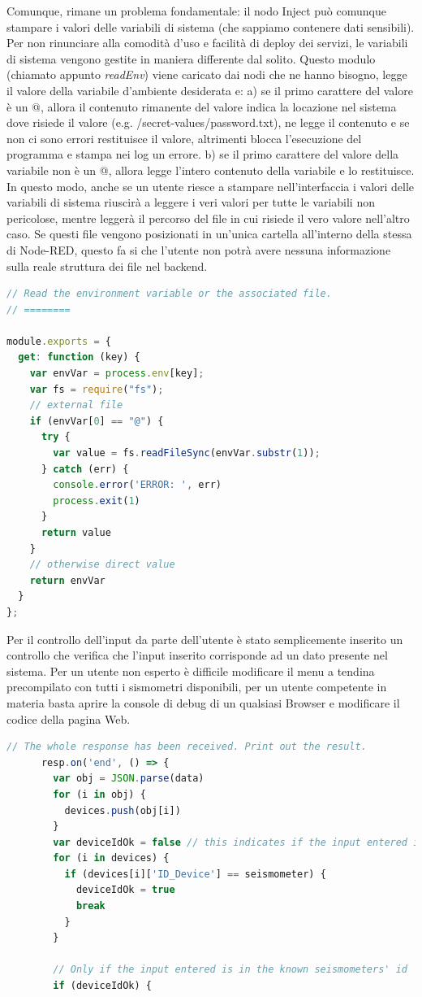 \documentclass[a4paper,10pt]{memoir}
\begin{document}
Comunque, rimane un problema fondamentale: il nodo Inject può comunque stampare i valori delle variabili di sistema (che sappiamo contenere dati sensibili).
Per non rinunciare alla comodità d'uso e facilità di deploy dei servizi, le variabili di sistema vengono gestite in maniera differente dal solito.
Questo modulo (chiamato appunto \textit{readEnv}) viene caricato dai nodi che ne hanno bisogno, legge il valore della variabile d'ambiente desiderata e: a) se il primo carattere del valore è un @, allora il contenuto rimanente del valore indica la locazione nel sistema dove risiede il valore (e.g. /secret-values/password.txt), ne legge il contenuto e se non ci sono errori restituisce il valore, altrimenti blocca l'esecuzione del programma e stampa nei log un errore. b) se il primo carattere del valore della variabile non è un @, allora legge l'intero contenuto della variabile e lo restituisce.
In questo modo, anche se un utente riesce a stampare nell'interfaccia i valori delle variabili di sistema riuscirà a leggere i veri valori per tutte le variabili non pericolose, mentre leggerà il percorso del file in cui risiede il vero valore nell'altro caso.
Se questi file vengono posizionati in un'unica cartella all'interno della stessa di Node-RED, questo fa si che l'utente non potrà avere nessuna informazione sulla reale struttura dei file nel backend.
\begin{lstlisting}[language=Javascript]
// Read the environment variable or the associated file.
// ========

module.exports = {
  get: function (key) {
    var envVar = process.env[key];
    var fs = require("fs");
    // external file
    if (envVar[0] == "@") {
      try {
        var value = fs.readFileSync(envVar.substr(1));
      } catch (err) {
        console.error('ERROR: ', err)
        process.exit(1)
      }
      return value
    }
    // otherwise direct value
    return envVar
  }
};

\end{lstlisting}

Per il controllo dell'input da parte dell'utente è stato semplicemente inserito un controllo che verifica che l'input inserito corrisponde ad un dato presente nel sistema.
Per un utente non esperto è difficile modificare il menu a tendina precompilato con tutti i sismometri disponibili, per un utente competente in materia basta aprire la console di debug di un qualsiasi Browser e modificare il codice della pagina Web.
\begin{lstlisting}[language=Javascript, firstnumber=34]
    // The whole response has been received. Print out the result.
      resp.on('end', () => {
        var obj = JSON.parse(data)
        for (i in obj) {
          devices.push(obj[i])
        }
        var deviceIdOk = false // this indicates if the input entered is in the group seismometers
        for (i in devices) {
          if (devices[i]['ID_Device'] == seismometer) {
            deviceIdOk = true
            break
          }
        }

        // Only if the input entered is in the known seismometers' id
        if (deviceIdOk) {
\end{lstlisting}
\end{document}
